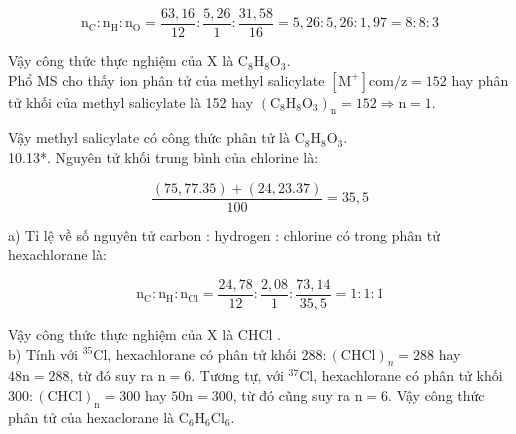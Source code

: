 \documentclass[10pt]{article}
\begin{document}
$$
\mathrm{n}_{\mathrm{C}}: \mathrm{n}_{\mathrm{H}}: \mathrm{n}_{\mathrm{O}}=\frac{63,16}{12}: \frac{5,26}{1}: \frac{31,58}{16}=5,26: 5,26: 1,97=8: 8: 3
$$

Vậy công thức thực nghiệm của X là $\mathrm{C}_{8} \mathrm{H}_{8} \mathrm{O}_{3}$.\\
Phổ MS cho thấy ion phân tử của methyl salicylate $\left[\mathrm{M}^{+}\right] \mathrm{co} \mathrm{m} / \mathrm{z}=152$ hay phân tử khối của methyl salicylate là 152 hay $\left(\mathrm{C}_{8} \mathrm{H}_{8} \mathrm{O}_{3}\right)_{\mathrm{n}}=152 \Rightarrow \mathrm{n}=1$.

Vậy methyl salicylate có công thức phân tử là $\mathrm{C}_{8} \mathrm{H}_{8} \mathrm{O}_{3}$.\\
10.13*. Nguyên tử khối trung bình của chlorine là:

$$
\frac{(75,77.35)+(24,23.37)}{100}=35,5
$$

a) Tỉ lệ về số nguyên tử carbon : hydrogen : chlorine có trong phân tử hexachlorane là:

$$
\mathrm{n}_{\mathrm{C}}: \mathrm{n}_{\mathrm{H}}: \mathrm{n}_{\mathrm{Cl}}=\frac{24,78}{12}: \frac{2,08}{1}: \frac{73,14}{35,5}=1: 1: 1
$$

Vậy công thức thực nghiệm của X là CHCl .\\
b) Tính với ${ }^{35} \mathrm{Cl}$, hexachlorane có phân tử khối $288:(\mathrm{CHCl})_{n}=288$ hay $48 \mathrm{n}=288$, từ đó suy ra $\mathrm{n}=6$. Tương tự, với ${ }^{37} \mathrm{Cl}$, hexachlorane có phân tử khối $300:(\mathrm{CHCl})_{\mathrm{n}}=300$ hay $50 \mathrm{n}=300$, từ đó cũng suy ra $\mathrm{n}=6$. Vậy công thức phân tử của hexaclorane là $\mathrm{C}_{6} \mathrm{H}_{6} \mathrm{Cl}_{6}$.
\end{document}
